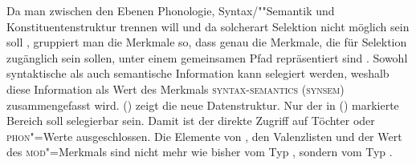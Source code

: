 Da man zwischen den Ebenen Phonologie, Syntax/""Semantik und Konstituentenstruktur trennen will
und da solcherart Selektion nicht möglich sein soll \citep[--144]{ps}, gruppiert man die Merkmale so,
dass genau die Merkmale, die für Selektion zugänglich sein sollen,
unter einem gemeinsamen Pfad repräsentiert sind \citep[]{ps2}.
Sowohl syntaktische als auch semantische Information kann selegiert werden, weshalb diese
Information als Wert des Merkmals \textsc{syntax-semantics} (\textsc{synsem}) zusammengefasst wird. ()
zeigt die neue Datenstruktur.
Nur der in () markierte Bereich soll selegierbar sein. Damit ist der direkte
Zugriff auf Töchter oder \textsc{phon}"=Werte ausgeschlossen. Die Elemente von \argst, den Valenzlisten
und der Wert des \textsc{mod}"=Merkmals sind nicht mehr wie bisher vom Typ , sondern vom Typ
.
\ea
{}
\z
%
\largerpage

